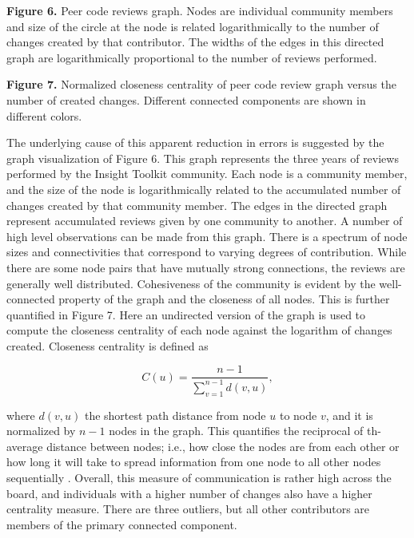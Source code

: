 \documentclass{frontiersENG} %
\begin{document}
\textbf{Figure 6. } {Peer code reviews graph.  Nodes are individual community
members and size of the circle at the node is related logarithmically to the
number of changes created by that contributor. The widths of the edges in
this directed graph are logarithmically proportional to the number of reviews
performed.} \label{fig:06}

\textbf{Figure 7. }{Normalized closeness centrality of peer code review graph
versus the number of created changes.  Different connected components are shown
in different colors.}\label{fig:07}

The underlying cause of this apparent reduction in errors is suggested by the
graph visualization of Figure 6. This graph represents
the three years of reviews performed by the Insight Toolkit community. Each
node is a community member, and the size of the node is logarithmically
related to the accumulated number of changes created by that community member.
The edges in the directed graph represent accumulated reviews given by one
community to another. A number of high level observations can be made from
this graph.  There is a spectrum of node sizes and connectivities that
correspond to varying degrees of contribution. While there are some node pairs
that have mutually strong connections, the reviews are generally well
distributed.  Cohesiveness of the community is evident by the well-connected
property of the graph and the closeness of all nodes.  This is further
quantified in Figure 7.  Here an undirected version
of the graph is used to compute the closeness centrality of each node against
the logarithm of changes created.  Closeness centrality is defined
as \cite{Freeman1979}

\begin{equation}
   C(u) = \frac{n - 1}{\sum_{v=1}^{n-1} d(v, u)},
\end{equation}

where $d(v, u)$ the shortest path distance from node $u$ to node $v$, and it
is normalized by $n-1$ nodes in the graph. This quantifies the reciprocal of th-
average distance between nodes; i.e., how close the nodes are from each other
or how long it will take to spread information from one node to all other
nodes sequentially \cite{Newman2005}. Overall, this measure of communication is
rather high across the board, and individuals with a higher
number of changes also have a higher centrality measure.  There are three
outliers, but all other contributors are members of the primary connected
component.
\end{document}
